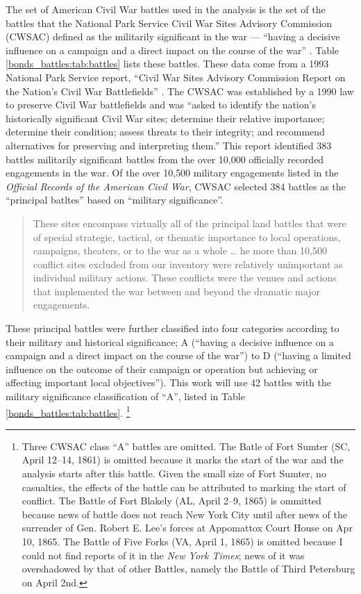 The set of American Civil War battles used in the analysis is the set of the battles that the National Park Service Civil War Sites Advisory Commission (CWSAC) defined as the militarily significant in the war --- ``having a decisive influence on a campaign and a direct impact on the course of the war'' \parencite{CWSAC1993}.
Table \ref{bonds_battles:tab:battles} lists these battles.
These data come from a 1993 National Park Service report, ``Civil War Sites Advisory Commission Report on the Nation's Civil War Battlefields'' \parencites{CWSAC1993}{CWSAC1993b}.
The CWSAC was established by a 1990 law to preserve Civil War battlefields and was ``asked to identify the nation's historically significant Civil War sites; determine their relative importance; determine their condition; assess threats to their integrity; and recommend alternatives for preserving and interpreting them.'' \parencite{CWSAC1993b}
This report identified 383 battles militarily significant battles from the over 10,000 officially recorded engagements in the war.
Of the over 10,500 military engagements listed in the \textit{Official Records of the American Civil War}, CWSAC selected 384 battles as the ``principal batltes'' based on ``military significance''. 
\begin{quote}
  These sites encompass virtually all of the principal land battles that were of special strategic, tactical, or thematic importance to local operations, campaigns, theaters, or to the war as a whole \dots{} he more than 10,500 conflict sites excluded from our inventory were relatively unimportant as individual military actions. These conflicts were the venues and actions that implemented the war between and beyond the dramatic major engagements. \parencite{CWSAC1993}
\end{quote}
These principal battles were further classified into four categories according to their military and historical significance; A (``having a decisive influence on a campaign and a direct impact on the course of the war'') to D (``having a limited influence on the outcome of their campaign or operation but achieving or affecting important local objectives'').
This work will use 42 battles with the military significance classification of ``A'', listed in Table \ref{bonds_battles:tab:battles}.%
\footnote{
  Three CWSAC class ``A'' battles are omitted.
  The Batle of Fort Sumter (SC, April 12--14, 1861) is omitted because it marks the start of the war and the analysis starts after this battle.
  Given the small size of Fort Sumter, no casualties, the effects of the battle can be attributed to marking the start of conflict.
  The Battle of Fort Blakely (AL, April 2--9, 1865) is ommitted because news of battle does not reach New York City until after news of the surrender of Gen. Robert E. Lee's forces at Appomattox Court House on Apr 10, 1865.
  The Battle of Five Forks (VA, April 1, 1865) is omitted because I could not find reports of it in the \textit{New York Times}; news of it was overshadowed by that of other Battles, namely the Battle of Third Petersburg on April 2nd.
}
